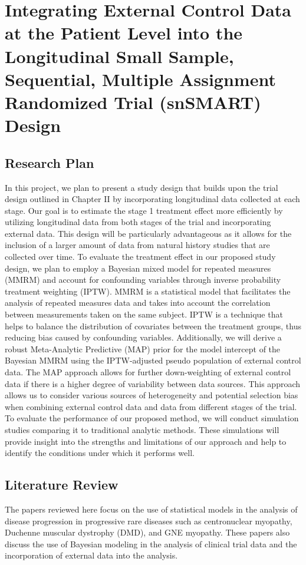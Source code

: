 \chapter{Integrating External Control Data at the Patient Level into the Longitudinal Small Sample, Sequential, Multiple Assignment Randomized Trial (snSMART) Design}
\label{chpt:chpt4}

\section{Research Plan}
In this project, we plan to present a study design that builds upon the trial design outlined in Chapter II by incorporating longitudinal data collected at each stage. Our goal is to estimate the stage 1 treatment effect more efficiently by utilizing longitudinal data from both stages of the trial and incorporating external data. This design will be particularly advantageous as it allows for the inclusion of a larger amount of data from natural history studies that are collected over time. To evaluate the treatment effect in our proposed study design, we plan to employ a Bayesian mixed model for repeated measures (MMRM) and account for confounding variables through inverse probability treatment weighting (IPTW). MMRM is a statistical model that facilitates the analysis of repeated measures data and takes into account the correlation between measurements taken on the same subject. IPTW is a technique that helps to balance the distribution of covariates between the treatment groups, thus reducing bias caused by confounding variables. Additionally, we will derive a robust Meta-Analytic Predictive (MAP) \citep{schmidli2014robust} prior for the model intercept of the Bayesian MMRM using the IPTW-adjusted pseudo population of external control data. The MAP approach allows for further down-weighting of external control data if there is a higher degree of variability between data sources. This approach allows us to consider various sources of heterogeneity and potential selection bias when combining external control data and data from different stages of the trial. To evaluate the performance of our proposed method, we will conduct simulation studies comparing it to traditional analytic methods. These simulations will provide insight into the strengths and limitations of our approach and help to identify the conditions under which it performs well.

\section{Literature Review}
The papers reviewed here focus on the use of statistical models in the analysis of disease progression in progressive rare diseases such as centronuclear myopathy, Duchenne muscular dystrophy (DMD), and GNE myopathy. These papers also discuss the use of Bayesian modeling in the analysis of clinical trial data and the incorporation of external data into the analysis.

